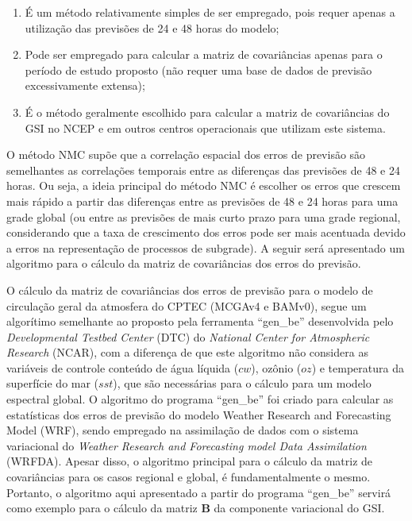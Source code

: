 \begin{enumerate}
    \item É um método relativamente simples de ser empregado, pois requer apenas a utilização das previsões de 24 e 48 horas do modelo;
    \item Pode ser empregado para calcular a matriz de covariâncias apenas para o período de estudo proposto (não requer uma base de dados de previsão excessivamente extensa);
    \item É o método geralmente escolhido para calcular a matriz de covariâncias do GSI no NCEP e em outros centros operacionais que utilizam este sistema.
\end{enumerate}

O método NMC supõe que a correlação espacial dos erros de previsão são semelhantes as correlações temporais entre as diferenças das previsões de 48 e 24 horas. Ou seja, a ideia principal do método NMC é escolher os erros que crescem mais rápido a partir das diferenças entre as previsões de 48 e 24 horas para uma grade global (ou entre as previsões de mais curto prazo para uma grade regional, considerando que a taxa de crescimento dos erros pode ser mais acentuada devido a erros na representação de processos de subgrade). A seguir será apresentado um algoritmo para o cálculo da matriz de covariâncias dos erros do previsão.

O cálculo da matriz de covariâncias dos erros de previsão para o modelo de circulação geral da atmosfera do CPTEC (MCGAv4 e BAMv0), segue um algorítimo semelhante ao proposto pela ferramenta ``gen\_be'' \cite{rizvietal/2009} desenvolvida pelo \textit{Developmental Testbed Center} (DTC) do \textit{National Center for Atmospheric Research} (NCAR), com a diferença de que este algoritmo não considera as variáveis de controle conteúdo de água líquida ($cw$), ozônio ($oz$) e temperatura da superfície do mar ($sst$), que são necessárias para o cálculo para um modelo espectral global. O algoritmo do programa ``gen\_be'' foi criado para calcular as estatísticas dos erros de previsão do modelo Weather Research and Forecasting Model (WRF), sendo empregado na assimilação de dados com o sistema variacional do \textit{Weather Research and Forecasting model Data Assimilation} (WRFDA). Apesar disso, o algoritmo principal para o cálculo da matriz de covariâncias para os casos regional e global, é fundamentalmente o mesmo. Portanto, o algoritmo aqui apresentado a partir do programa ``gen\_be'' servirá como exemplo para o cálculo da matriz $\mathbf{B}$ da componente variacional do GSI.

